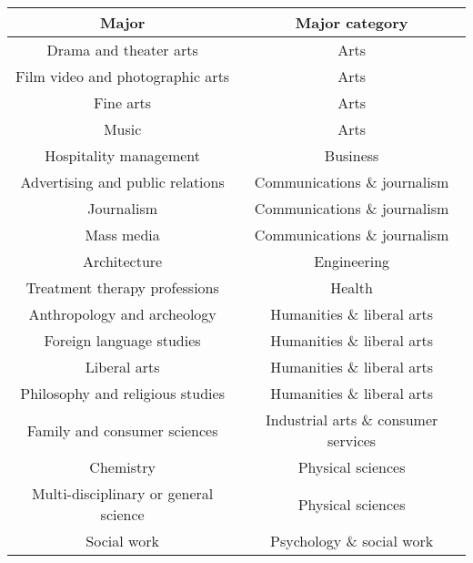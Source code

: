 \documentclass[11pt]{article}
\begin{document}
\begin{center}
    \begin{tabular} {|| c c ||}
    \hline
    Major & Major category \\ [0.5ex]
    \hline\hline
    Drama and theater arts & Arts \\
    \hline
    Film video and photographic arts & Arts \\
    \hline
    Fine arts & Arts \\
    \hline
    Music & Arts \\
    \hline
    Hospitality management & Business \\
    \hline
    Advertising and public relations & Communications \& journalism \\
    \hline
    Journalism & Communications \& journalism \\
    \hline
    Mass media & Communications \& journalism \\
    \hline
    Architecture & Engineering \\
    \hline
    Treatment therapy professions & Health \\
    \hline
    Anthropology and archeology & Humanities \& liberal arts \\
    \hline
    Foreign language studies & Humanities \& liberal arts \\
    \hline
    Liberal arts & Humanities \& liberal arts \\
    \hline
    Philosophy and religious studies & Humanities \& liberal arts \\
    \hline
    Family and consumer sciences & Industrial arts \& consumer services \\
    \hline
    Chemistry & Physical sciences \\
    \hline
    Multi-disciplinary or general science & Physical sciences \\
    \hline
    Social work & Psychology \& social work \\
    \hline
    \end {tabular}
\end{center}
\end{document}
